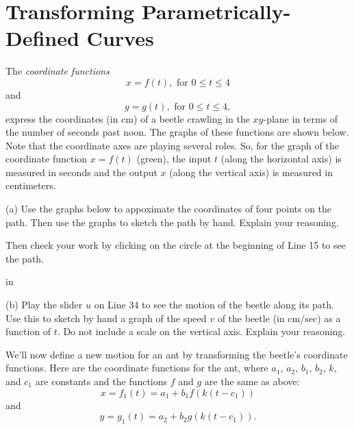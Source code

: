 \documentclass{ximera}
\newcommand{\pskip}{\vskip 0.1 in}
\begin{document}
\section{Transforming Parametrically-Defined Curves}
\begin{example} \label{Ex0}
The \emph{coordinate functions}
\[
     x = f(t) , \text{ for } 0\leq t \leq 4
\]
and
\[
    y = g(t) , \text{ for }0 \leq t \leq 4 ,
\]
express the coordinates (in cm) of a beetle crawling in the $xy$-plane in terms of the number of seconds past noon. The graphs of these functions are shown below. Note that the coordinate axes are playing several roles. So, for the graph of the coordinate function $x=f(t)$ (green), the input $t$ (along the horizontal axis) is measured in seconds and the output $x$ (along the vertical axis) is measured in centimeters. 



\begin{exploration}\label{exp:pc1c}
(a) Use the graphs below to appoximate the coordinates of four points on the path. Then use the graphs to sketch the path by hand. Explain your reasoning.

Then check your work by clicking on the circle at the beginning of Line 15 to see the path. 

\pskip

(b) Play the slider $u$ on Line 34 to see the motion of the beetle along its path. Use this to sketch by hand a graph of the speed $v$ of the beetle (in cm/sec) as a function of $t$. Do not include a scale on the vertical axis. Explain your reasoning.


 
\begin{onlineOnly}
    \begin{center}
\end{center}
\end{onlineOnly}
\end{exploration}

We'll now define a new motion for an ant by transforming the beetle's coordinate functions. Here are the coordinate functions for the ant, where $a_1$, $a_2$, $b_1$, $b_2$, $k$, and $c_1$ are constants and the functions $f$ and $g$ are the same as above:
\[
   x = f_1(t) = a_1 + b_1 f(k(t-c_1))
\]
and
\[
   y =g_1(t) = a_2 + b_2 g(k(t-c_1)) .
\]


\end{example}
\end{document}
